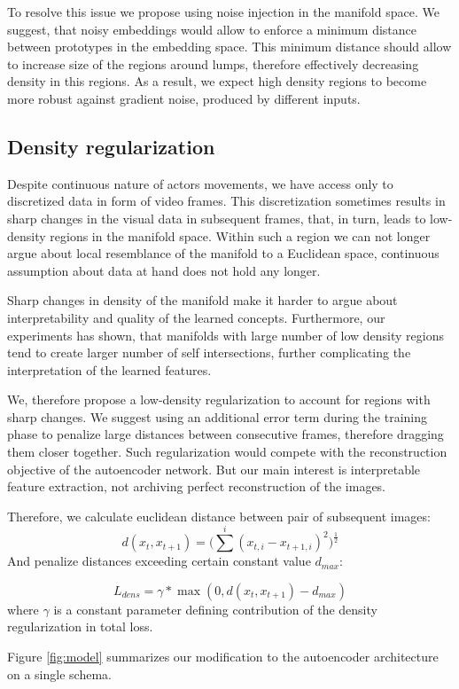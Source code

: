 To resolve this issue we propose using noise injection in the manifold space.
We suggest, that noisy embeddings would allow to enforce a minimum distance between prototypes in the embedding space.
This minimum distance should allow to increase size of the regions around lumps, therefore effectively decreasing density in this regions.
As a result, we expect high density regions to become more robust against gradient noise, produced by different inputs.


\subsection{Density regularization}

Despite continuous nature of actors movements, we have access only to discretized data in form of video frames.
This discretization sometimes results in sharp changes in the visual data in subsequent frames, that, in turn, leads to low-density regions in the manifold space.
Within such a region we can not longer argue about local resemblance of the manifold to a Euclidean space, continuous assumption about data at hand does not hold any longer.

Sharp changes in density of the manifold make it harder to argue about interpretability and quality of the learned concepts. Furthermore, our experiments has shown, that manifolds with large number of low density regions tend to create larger number of self intersections, further complicating the interpretation of the learned features.

We, therefore propose a low-density regularization to account for regions with sharp changes.
We suggest using an additional error term during the training phase to penalize large distances between consecutive frames, therefore dragging them closer together.
Such regularization would compete with the reconstruction objective of the autoencoder network.
But our main interest is interpretable feature extraction, not archiving perfect reconstruction of the images.

Therefore, we calculate euclidean distance between pair of subsequent images:
\begin{equation*}
d(x_t, x_{t+1}) = \Big(\sum^i { (x_{t,i}-x_{t+1, i})^2}\Big)^{\frac{1}{2}}
\end{equation*}
And penalize distances exceeding certain constant value $d_{max}$:

\begin{equation*}
  L_{dens} = \gamma*\max(0, d(x_t, x_{t+1})-d_{max})
\end{equation*}
where $\gamma$ is a constant parameter defining contribution of the density regularization in total loss.


Figure \ref{fig:model} summarizes our modification to the autoencoder architecture on a single schema.


